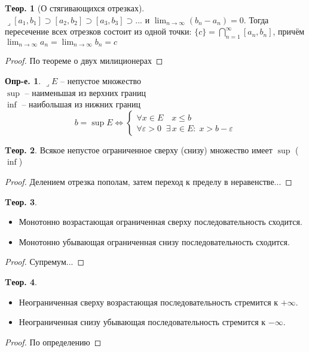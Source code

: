 \documentclass[a4paper,12pt]{article}
\numberwithin{figure}{section}
\theoremstyle{definition}
\newtheorem{definition}{Опр-е.}[section]
\theoremstyle{definition}
\newtheorem{theorem}{Tеор.}[section]
\def\DS{\displaystyle}
\def\.{\;\;}
\def\eps{\varepsilon}
\def\ntoinf{n\to\infty}
\def\leqs{\leqslant}
\def\lets{{\huge$\lrcorner$}\space}
\begin{document}
\begin{theorem}[О стягивающихся отрезках] \ \\
	\lets $[a_1,b_1] \supset [a_2,b_2] \supset [a_3,b_3] \supset ...$
	и $\DS \lim_{\ntoinf}(b_n-a_n) = 0$.
	Тогда пересечение всех отрезков состоит из одной точки:
	$\DS \{c\} = \bigcap_{n=1}^{\infty} [a_n,b_n]$, причём
	$\DS \lim_{\ntoinf}a_n = \lim_{\ntoinf}b_n = c$
\end{theorem}
\begin{proof} По теореме о двух милиционерах \end{proof}
\bigskip

\begin{definition}
	\lets $E$ -- непустое множество \\
	$\sup$ -- наименьшая из верхних границ \\
	$\inf$ -- наибольшая из нижних границ
	\[ b = \sup E \Longleftrightarrow
		\begin{cases*}
			\forall x \in E \quad x \leqs b \\
			\forall \eps > 0 \. \exists\, x \in E : \;  x > b - \eps
		\end{cases*}
	\]
\end{definition}
\bigskip

\begin{theorem}
	Всякое непустое ограниченное сверху (снизу) множество имеет $\sup$ ($\inf$)
\end{theorem}
\begin{proof} Делением отрезка пополам, затем переход к пределу в неравенстве... \end{proof}
\bigskip

\begin{theorem}  \ \\
	\begin{itemize}
		\item Монотонно возрастающая ограниченная сверху последовательность сходится.
		\item Монотонно убывающая ограниченная снизу последовательность сходится.
	\end{itemize}
\end{theorem}
\begin{proof} Супремум... \end{proof}
\bigskip

\begin{theorem}  \ \\
	\begin{itemize}
		\item Неограниченная сверху возрастающая последовательность стремится к $+\infty$.
		\item Неограниченная снизу убывающая последовательность стремится к $-\infty$.
	\end{itemize}
\end{theorem}
\begin{proof} По определению \end{proof}
\bigskip
\end{document}
